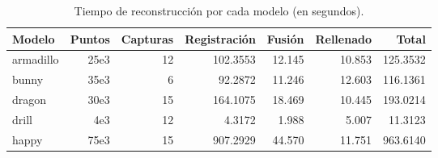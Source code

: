 \begin{table}
	\centering
	\begin{tabular}{l*{6}{r}}
		\toprule
		Modelo    & Puntos   & Capturas  &  Registración & Fusión   & Rellenado & Total  \\
		\midrule                          
		armadillo  & 25e3    &   12      & 102.3553      &  12.145  &  10.853    &  	125.3532      \\
		bunny      & 35e3    &    6      &  92.2872      &  11.246  &  12.603    &  	116.1361      \\
		dragon     & 30e3    &   15      & 164.1075      &  18.469  &  10.445    &  	193.0214      \\
		drill      &  4e3     &   12      &   4.3172      &   1.988   &   5.007  &  	 11.3123      \\
		happy      & 75e3    &   15      & 907.2929      &  44.570  &  11.751    &  	963.6140      \\
		\bottomrule
	\end{tabular}
	\caption[Tiempo de reconstrucción]{\label{tab:reconstr_time}Tiempo de reconstrucción por cada modelo (en segundos).}
\end{table}
